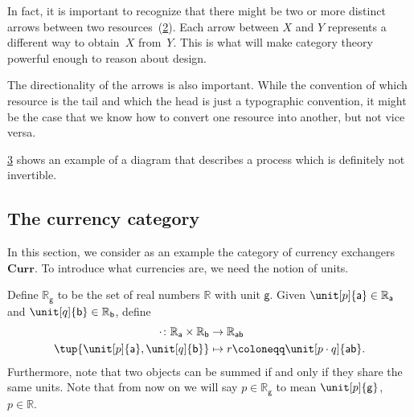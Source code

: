 \begin{figure}[h!]
    \centering
    \caption{\label{fig:e8}}
\end{figure}

In fact, it is important to recognize that there might be two or more distinct
arrows between two resources~(\cref{fig:e9}). Each arrow between $X$ and $Y$ represents a different way  to obtain~$X$ from~$Y$. This is what will make category theory powerful enough to reason about design.


\begin{figure}[h!]
    \centering
    \caption{\label{fig:e9}}
\end{figure}

The directionality of the arrows is also important. While the convention of
which resource is the tail and which the head is just a typographic convention,
it might be the case that we know how to convert one resource into another, but
not vice versa.

\cref{fig:e10} shows an example of a diagram that describes a process which is definitely
not invertible.

\begin{figure}[h!]
    \centering
    \caption{\label{fig:e10}}
\end{figure}
\subsection{The currency category}
In this section, we consider as an example the category of currency exchangers $\mathbf{Curr}$. To introduce what currencies are, we need the notion of units.
\begin{definition}
    Define $\mathbb{R}_\mathsf{g}$ to be the set of real numbers $\mathbb{R}$ with unit $\mathsf{g}$. Given $\unit[p]{\mathsf{a}} \in \mathbb{R}_\mathsf{a}$ and $\unit[q]{\mathsf{b}}\in \mathbb{R}_\mathsf{b}$, define
    \begin{equation}
    \begin{aligned}
    \cdot \colon \mathbb{R}_\mathsf{a} \times \mathbb{R}_\mathsf{b} &\to \mathbb{R}_\mathsf{ab}\\
    \tup{\unit[p]{\mathsf{a}},\unit[q]{\mathsf{b}}}&\mapsto r\coloneqq \unit[p\cdot q]{\mathsf{ab}}.
    \end{aligned}
    \end{equation}
    Furthermore, note that two objects can be summed if and only if they share the same units. Note that from now on we will say $p\in \mathbb{R}_\mathsf{g}$ to mean $\unit[p]{\mathsf{g}}$, $p\in \mathbb{R}$.
\end{definition}

